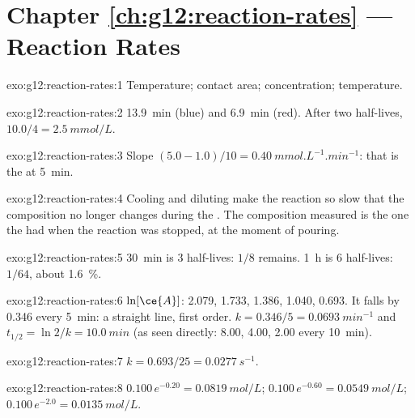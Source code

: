 \section*{Chapter \ref{ch:g12:reaction-rates} --- Reaction Rates}

\begin{solution}{exo:g12:reaction-rates:1}
Temperature; contact area; concentration; temperature.
\end{solution}

\begin{solution}{exo:g12:reaction-rates:2}
\qty{13.9}{min} (blue) and \qty{6.9}{min} (red). After two half-lives,
$10.0 / 4 = \qty{2.5}{mmol/L}$.
\end{solution}

\begin{solution}{exo:g12:reaction-rates:3}
Slope $(5.0 - 1.0)/10 = \qty{0.40}{mmol.L^{-1}.min^{-1}}$: that is the
 at \qty{5}{min}.
\end{solution}

\begin{solution}{exo:g12:reaction-rates:4}
Cooling and diluting make the reaction so slow that the composition no
longer changes during the . The composition measured is the one
the  had when the reaction was stopped, at the moment of pouring.
\end{solution}

\begin{solution}{exo:g12:reaction-rates:5}
\qty{30}{min} is 3 half-lives: $1/8$ remains. \qty{1}{h} is 6 half-lives:
$1/64$, about \qty{1.6}{\percent}.
\end{solution}

\begin{solution}{exo:g12:reaction-rates:6}
$\ln[\ce{A}]$: 2.079, 1.733, 1.386, 1.040, 0.693. It falls by 0.346 every
\qty{5}{min}: a straight line, first order. $k = 0.346/5 =
\qty{0.0693}{min^{-1}}$ and $t_{1/2} = \ln 2 / k = \qty{10.0}{min}$ (as
seen directly: 8.00, 4.00, 2.00 every \qty{10}{min}).
\end{solution}

\begin{solution}{exo:g12:reaction-rates:7}
$k = 0.693 / 25 = \qty{0.0277}{s^{-1}}$.
\end{solution}

\begin{solution}{exo:g12:reaction-rates:8}
$0.100\,e^{-0.20} = \qty{0.0819}{mol/L}$; $0.100\,e^{-0.60} =
\qty{0.0549}{mol/L}$; $0.100\,e^{-2.0} = \qty{0.0135}{mol/L}$.
\end{solution}

